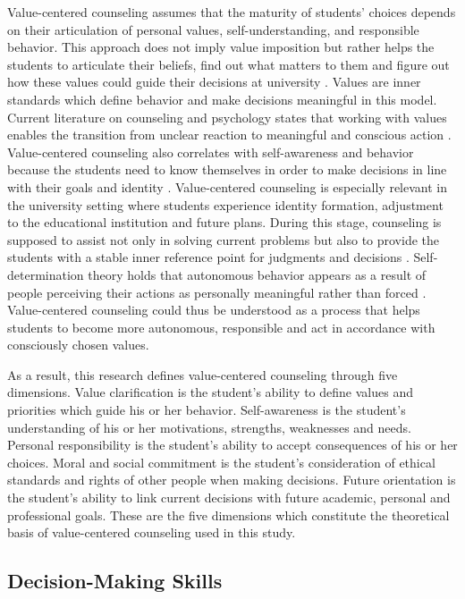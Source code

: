 \documentclass[10pt]{NSP1}
\begin{document}
Value-centered counseling assumes that the maturity of students' choices depends on their articulation of personal values, self-understanding, and responsible behavior. This approach does not imply value imposition but rather helps the students to articulate their beliefs, find out what matters to them and figure out how these values could guide their decisions at university \cite{ref10}. Values are inner standards which define behavior and make decisions meaningful in this model. Current literature on counseling and psychology states that working with values enables the transition from unclear reaction to meaningful and conscious action \cite{ref11}. Value-centered counseling also correlates with self-awareness and behavior because the students need to know themselves in order to make decisions in line with their goals and identity \cite{ref12}. Value-centered counseling is especially relevant in the university setting where students experience identity formation, adjustment to the educational institution and future plans. During this stage, counseling is supposed to assist not only in solving current problems but also to provide the students with a stable inner reference point for judgments and decisions \cite{ref13}. Self-determination theory holds that autonomous behavior appears as a result of people perceiving their actions as personally meaningful rather than forced \cite{ref14}. Value-centered counseling could thus be understood as a process that helps students to become more autonomous, responsible and act in accordance with consciously chosen values.

As a result, this research defines value-centered counseling through five dimensions. Value clarification is the student's ability to define values and priorities which guide his or her behavior. Self-awareness is the student's understanding of his or her motivations, strengths, weaknesses and needs. Personal responsibility is the student's ability to accept consequences of his or her choices. Moral and social commitment is the student's consideration of ethical standards and rights of other people when making decisions. Future orientation is the student's ability to link current decisions with future academic, personal and professional goals. These are the five dimensions which constitute the theoretical basis of value-centered counseling used in this study.

\subsection{Decision-Making Skills}
\end{document}
